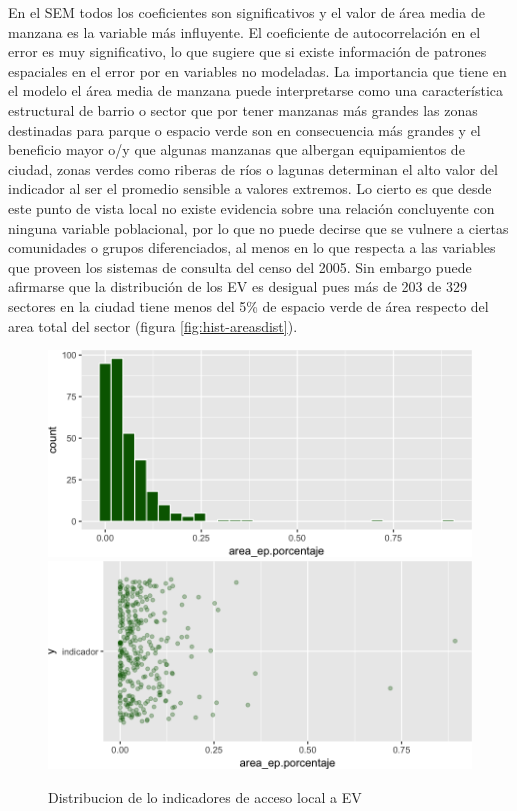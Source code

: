 \documentclass[12pt,]{book}
\begin{document}
En el SEM todos los coeficientes son significativos y el valor de área
media de manzana es la variable más influyente. El coeficiente de
autocorrelación en el error es muy significativo, lo que sugiere que si
existe información de patrones espaciales en el error por en variables
no modeladas. La importancia que tiene en el modelo el área media de
manzana puede interpretarse como una característica estructural de
barrio o sector que por tener manzanas más grandes las zonas destinadas
para parque o espacio verde son en consecuencia más grandes y el
beneficio mayor o/y que algunas manzanas que albergan equipamientos de
ciudad, zonas verdes como riberas de ríos o lagunas determinan el alto
valor del indicador al ser el promedio sensible a valores extremos. Lo
cierto es que desde este punto de vista local no existe evidencia sobre
una relación concluyente con ninguna variable poblacional, por lo que no
puede decirse que se vulnere a ciertas comunidades o grupos
diferenciados, al menos en lo que respecta a las variables que proveen
los sistemas de consulta del censo del 2005. Sin embargo puede afirmarse
que la distribución de los EV es desigual pues más de 203 de 329
sectores en la ciudad tiene menos del 5\% de espacio verde de área
respecto del area total del sector (figura \ref{fig:hist-areasdist}).

\begin{figure}
\includegraphics[width=1\linewidth]{tesis-unigis_files/figure-latex/hist-areaep-1} \includegraphics[width=1\linewidth]{tesis-unigis_files/figure-latex/hist-areaep-2} \caption{Distribucion de lo indicadores de acceso local a EV }\label{fig:hist-areaep}
\end{figure}
\end{document}
